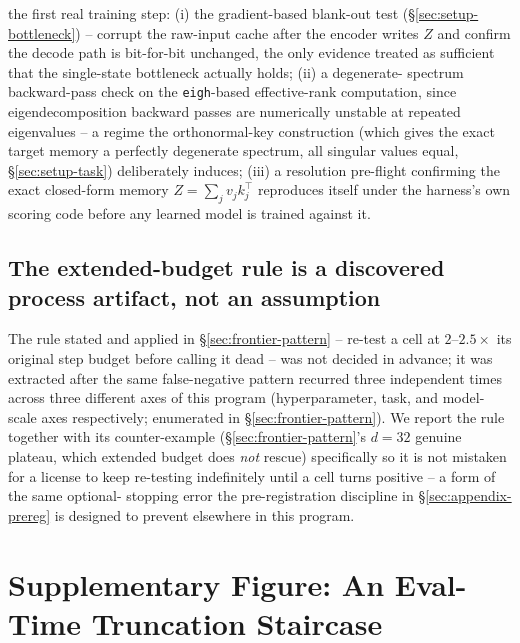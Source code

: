 \begin{enumerate}
      the first real training step: (i) the gradient-based blank-out
      test (\S\ref{sec:setup-bottleneck}) -- corrupt the raw-input cache
      after the encoder writes $Z$ and confirm the decode path is
      bit-for-bit unchanged, the only evidence treated as sufficient that
      the single-state bottleneck actually holds; (ii) a degenerate-
      spectrum backward-pass check on the \texttt{eigh}-based
      effective-rank computation, since eigendecomposition backward
      passes are numerically unstable at repeated eigenvalues -- a
      regime the orthonormal-key construction (which gives the exact
      target memory a perfectly degenerate spectrum, all singular values
      equal, \S\ref{sec:setup-task}) deliberately induces; (iii) a
      resolution pre-flight confirming the exact closed-form memory
      $Z=\sum_jv_jk_j^\top$ reproduces itself under the harness's own
      scoring code before any learned model is trained against it.
\end{enumerate}

\subsection{The extended-budget rule is a discovered process artifact, not
an assumption}
\label{sec:appendix-budget}

The rule stated and applied in \S\ref{sec:frontier-pattern} --
re-test a cell at $2$--$2.5\times$ its original step budget before
calling it dead -- was not decided in advance; it was extracted after the
same false-negative pattern recurred three independent times across three
different axes of this program (hyperparameter, task, and model-scale
axes respectively; enumerated in \S\ref{sec:frontier-pattern}). We report
the rule together with its counter-example (\S\ref{sec:frontier-pattern}'s
$d{=}32$ genuine plateau, which extended budget does \emph{not} rescue)
specifically so it is not mistaken for a license to keep re-testing
indefinitely until a cell turns positive -- a form of the same optional-
stopping error the pre-registration discipline in
\S\ref{sec:appendix-prereg} is designed to prevent elsewhere in this
program.

\section{Supplementary Figure: An Eval-Time Truncation Staircase}
\label{sec:appendix-supp-figure}

